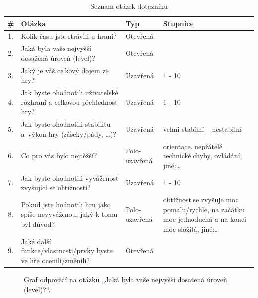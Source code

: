 \begin{table}[h]
    \centering
    \renewcommand{\arraystretch}{1.3}
    \begin{tabularx}{\textwidth}{c|X|l|X}
    \hline
    \textbf{\#} & \textbf{Otázka} & \textbf{Typ} & \textbf{Stupnice} \\ \hline
    1. & Kolik času jste strávili u hraní? & Otevřená & \\ 
    2. & Jaká byla vaše nejvyšší dosažená úroveň (level)? & Otevřená &  \\ 
    3. & Jaký je váš celkový dojem ze hry? & Uzavřená &  1 - 10 \\ 
    4. & Jak byste ohodnotili uživatelské rozhraní a celkovou přehlednost hry? & Uzavřená & 1 - 10\\ 
    5. & Jak byste ohodnotili stabilitu a~výkon hry (záseky/pády, \ldots)? & Uzavřená & velmi stabilní – nestabilní\\ 
    6. & Co pro vás bylo nejtěžší? & Polo-uzavřená & orientace, nepřátelé technické chyby, ovládání, jiné:\ldots \\ 
    7. & Jak byste ohodnotili vyváženost zvyšující se obtížnosti? & Uzavřená &  1 - 10 \\ 
    8. & Pokud jste hodnotili hru jako spíše nevyváženou, jaký k tomu byl důvod? & Polo-uzavřená & obtížnost se zvyšuje moc pomalu/rychle, na začátku moc jednoduchá a na konci moc složitá, jiné:\ldots \\ 
    9. & Jaké další funkce/vlastnosti/prvky byste ve hře ocenili/změnili? & Otevřená & \\
    \hline
    \end{tabularx}
    \caption{Seznam otázek dotazníku}
    \label{tab:questions}
\end{table}

\begin{figure}[ht]
    \centering
    \caption{Graf odpovědí na otázku „Jaká byla vaše nejvyšší dosažená úroveň (level)?“.}
    \label{fig:nejvyssi_uroven}
\end{figure}

